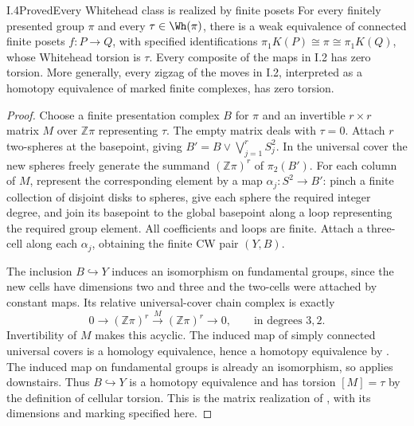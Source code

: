 \begin{claim}{I.4}{Proved}{Every Whitehead class is realized by finite posets}
For every finitely presented group $\pi$ and every
$\tau\in\Wh(\pi)$, there is a weak equivalence of connected finite
posets $f:P\to Q$, with specified identifications
$\pi_1K(P)\cong\pi\cong\pi_1K(Q)$, whose Whitehead torsion is $\tau$.
Every composite of the maps in I.2 has zero torsion. More generally,
every zigzag of the moves in I.2, interpreted as a homotopy equivalence
of marked finite complexes, has zero torsion.
\end{claim}
\begin{proof}
Choose a finite presentation complex $B$ for $\pi$ and an invertible
$r\times r$ matrix $M$ over $\mathbb Z\pi$ representing $\tau$.
The empty matrix deals with $\tau=0$. Attach $r$ two-spheres at the
basepoint, giving $B'=B\vee\bigvee_{j=1}^r S^2_j$.
In the universal cover the new spheres freely generate the summand
$(\mathbb Z\pi)^r$ of $\pi_2(B')$. For each column of $M$, represent
the corresponding element by a map $\alpha_j:S^2\to B'$:
pinch a finite collection of disjoint disks to spheres, give each
sphere the required integer degree, and join its basepoint to the
global basepoint along a loop representing the required group element.
All coefficients and loops are finite. Attach a three-cell along each
$\alpha_j$, obtaining the finite CW pair $(Y,B)$.

The inclusion $B\hookrightarrow Y$ induces an isomorphism on
fundamental groups, since the new cells have dimensions two and three
and the two-cells were attached by constant maps. Its relative
universal-cover chain complex is exactly
\[
 0\longrightarrow (\mathbb Z\pi)^r
   \xrightarrow{\ M\ }(\mathbb Z\pi)^r\longrightarrow0,
 \qquad\text{in degrees }3,2.
\]
Invertibility of $M$ makes this acyclic. The induced map of simply
connected universal covers is a homology equivalence, hence a homotopy
equivalence by \cite[Corollary~4.33]{I_Hatcher2002}. The induced
map on fundamental groups is already an isomorphism, so
\cite[Theorem~4.5]{I_Hatcher2002} applies downstairs.
Thus $B\hookrightarrow Y$ is a homotopy equivalence and has torsion
$[M]=\tau$ by the definition of cellular torsion.
This is the matrix realization of
\cite[Remark~6]{I_LurieWhiteheadII}, with its dimensions and
marking specified here.


\end{proof}
